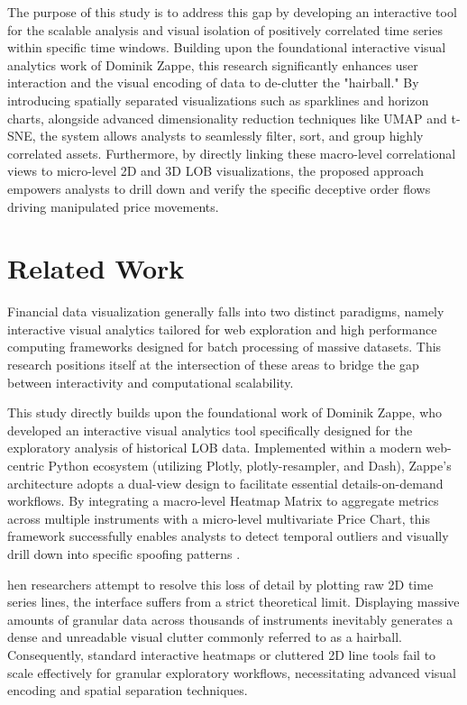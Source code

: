 \documentclass[final,3p,times,twocolumn]{elsarticle}
\begin{document}
The purpose of this study is to address this gap by developing an interactive tool for the scalable analysis and visual isolation of positively correlated time series within specific time windows. Building upon the foundational interactive visual analytics work of Dominik Zappe, this research significantly enhances user interaction and the visual encoding of data to de-clutter the "hairball." By introducing spatially separated visualizations such as sparklines and horizon charts, alongside advanced dimensionality reduction techniques like UMAP and t-SNE, the system allows analysts to seamlessly filter, sort, and group highly correlated assets. Furthermore, by directly linking these macro-level correlational views to micro-level 2D and 3D LOB visualizations, the proposed approach empowers analysts to drill down and verify the specific deceptive order flows driving manipulated price movements.

\section{Related Work}\label{sec:relatedwork}

Financial data visualization generally falls into two distinct paradigms, namely interactive visual analytics tailored for web exploration and high performance computing frameworks designed for batch processing of massive datasets. This research positions itself at the intersection of these areas to bridge the gap between interactivity and computational scalability.

This study directly builds upon the foundational work of Dominik Zappe, who developed an interactive visual analytics tool specifically designed for the exploratory analysis of historical LOB data. Implemented within a modern web-centric Python ecosystem (utilizing Plotly, plotly-resampler, and Dash), Zappe’s architecture adopts a dual-view design to facilitate essential details-on-demand workflows. By integrating a macro-level Heatmap Matrix to aggregate metrics across multiple instruments with a micro-level multivariate Price Chart, this framework successfully enables analysts to detect temporal outliers and visually drill down into specific spoofing patterns \cite{Zappe2025}. 

hen researchers attempt to resolve this loss of detail by plotting raw 2D time series lines, the interface suffers from a strict theoretical limit. Displaying massive amounts of granular data across thousands of instruments inevitably generates a dense and unreadable visual clutter commonly referred to as a hairball. Consequently, standard interactive heatmaps or cluttered 2D line tools fail to scale effectively for granular exploratory workflows, necessitating advanced visual encoding and spatial separation techniques.
\end{document}
